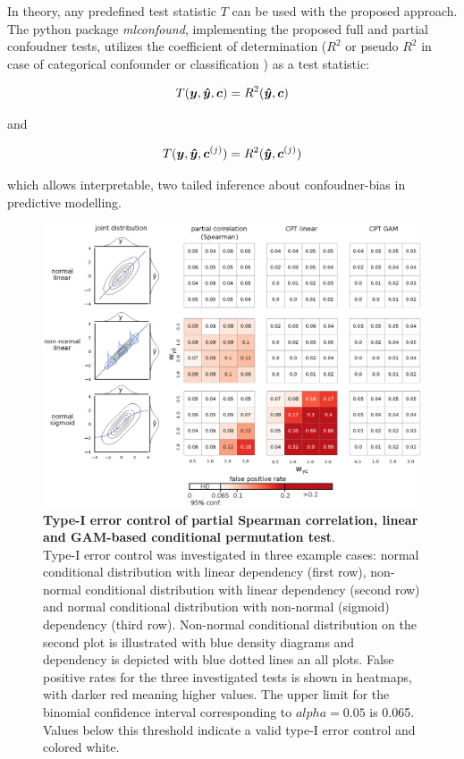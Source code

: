 \documentclass{article}
\begin{document}
In theory, any predefined test statistic $T$ can be used with the proposed approach. The python package \emph{mlconfound}, implementing the proposed full and partial confoudner tests, utilizes the coefficient of determination ($R^2$ or pseudo $R^2$ in case of categorical confounder or classification \citep{starkweather2011multinomial}) as a test statistic:

$$T(\boldsymbol{y}, \boldsymbol{\hat{y}}, \boldsymbol{c}) = R^2(\boldsymbol{\hat{y}}, \boldsymbol{c})$$ 

and

$$T(\boldsymbol{y}, \boldsymbol{\hat{y}}, \boldsymbol{c}^{(j)}) = R^2(\boldsymbol{\hat{y}}, \boldsymbol{c}^{(j)})$$ 

which allows interpretable, two tailed inference about confoudner-bias in predictive modelling.

\begin{figure}[!b]
  \centering
  \includegraphics[width=0.75\paperwidth]{fig/sim_h0_demo.eps}
  \caption{\textbf{Type-I error control of partial Spearman correlation, linear and GAM-based conditional permutation test}. \\
  Type-I error control was investigated in three example cases: normal conditional distribution with linear dependency (first row), non-normal conditional distribution with linear dependency (second row) and normal conditional distribution with non-normal (sigmoid) dependency (third row). Non-normal conditional distribution on the second plot is illustrated with blue density diagrams and dependency is depicted with blue dotted lines an all plots. False positive rates for the three investigated tests is shown in heatmaps, with darker red meaning higher values. The upper limit for the binomial confidence interval corresponding to $alpha=0.05$ is 0.065. Values below this threshold indicate a valid type-I error control and colored white.
  }
  \label{fig:sim-h0-demo}
\end{figure}
\end{document}
